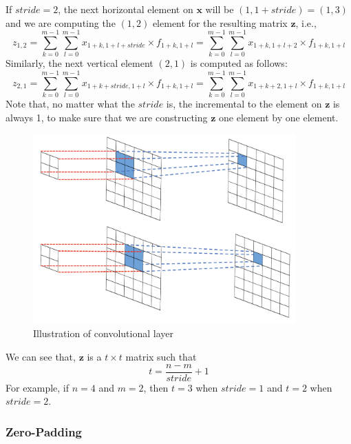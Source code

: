 If $stride=2$, the next horizontal  element on $\textbf{x}$ will be $(1,1+stride)=(1,3)$ and we are computing the $(1,2)$ element for the resulting matrix $\textbf{z}$, i.e., 
\begin{equation}
    z_{1,2} = \sum_{k=0}^{m-1}\sum_{l=0}^{m-1} x_{1+k,1+l+stride}\times f_{1+k,1+l}= \sum_{k=0}^{m-1}\sum_{l=0}^{m-1} x_{1+k,1+l+2}\times f_{1+k,1+l}
\end{equation}
Similarly, the next vertical  element $(2,1)$ is computed as follows: 
\begin{equation}
    z_{2,1} = \sum_{k=0}^{m-1}\sum_{l=0}^{m-1} x_{1+k+stride,1+l}\times f_{1+k,1+l}= \sum_{k=0}^{m-1}\sum_{l=0}^{m-1} x_{1+k+2,1+l}\times f_{1+k,1+l}
\end{equation}
Note that, no matter what the $stride$ is, the incremental to the element on $\textbf{z}$ is always 1, to make sure that we are constructing $\textbf{z}$ one element by one element. 


\begin{figure}[!htbp]
    \centering
    \includegraphics[width=0.9\textwidth]{images/deepLearning/CNN/convolutional.png}
    \caption{Illustration of convolutional layer}
    \label{fig:convolutinallayer}
\end{figure}

We can see that, $\textbf{z}$ is a $t\times t$ matrix such that 
\begin{equation}
    t = \frac{n-m}{stride}+1
\end{equation}
For example, if $n=4$ and $m=2$, then $t=3$ when $stride=1$ and $t=2$ when $stride=2$. 

\subsubsection{Zero-Padding}

